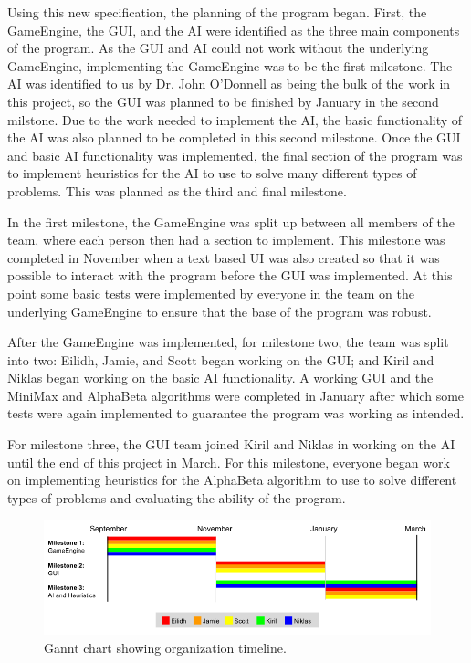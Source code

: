 \documentclass{l3proj}
\begin{document}
Using this new specification, the planning of the program began.  First, the GameEngine, the GUI, and the AI were identified as the three main components of the program.  As the GUI and AI could not work without the underlying GameEngine, implementing the GameEngine was to be the first milestone. The AI was identified to us by Dr. John O’Donnell as being the bulk of the work in this project, so the GUI was planned to be finished by January in the second milstone.  Due to the work needed to implement the AI, the basic functionality of the AI was also planned to be completed in this second milestone.  Once the GUI and basic AI functionality was implemented, the final section of the program was to implement heuristics for the AI to use to solve many different types of problems.  This was planned as the third and final milestone.

In the first milestone, the GameEngine was split up between all members of the team, where each person then had a section to implement.  This milestone was completed in November when a text based UI was also created so that it was possible to interact with the program before the GUI was implemented.  At this point some basic tests were implemented by everyone in the team on the underlying GameEngine to ensure that the base of the program was robust.

After the GameEngine was implemented, for milestone two, the team was split into two: Eilidh, Jamie, and Scott began working on the GUI; and Kiril and Niklas began working on the basic AI functionality.  A working GUI and the MiniMax and AlphaBeta algorithms were completed in January after which some tests were again implemented to guarantee the program was working as intended.

For milestone three, the GUI team joined Kiril and Niklas in working on the AI until the end of this project in March.  For this milestone, everyone began work on implementing heuristics for the AlphaBeta algorithm to use to solve different types of problems and evaluating the ability of the program.

\begin{figure}[H]
\centering
\includegraphics[scale=0.5]{Images/GanntChart.png}
\caption{Gannt chart showing organization timeline.}
\end{figure}
\end{document}
